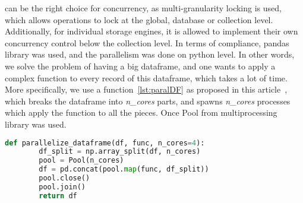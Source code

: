 can be the right choice for concurrency, 
as multi-granularity locking is used, which allows
operations to lock at the global, database or collection level. 
Additionally, for individual storage engines, it is allowed
to implement their own concurrency control below the collection level. 
In terms of compliance, pandas library was used, and the parallelism was done
on python level. In other words, we solve the problem of having 
a big dataframe, and one wants to apply a complex function to every 
record of this dataframe, which takes a lot of time. 
More specifically, we use a function~\ref{lst:paralDF} 
as proposed in this article~\cite{ParallelDF}, 
which breaks the dataframe into \emph{n\_cores} parts, 
and spawns \emph{n\_cores} processes which apply 
the function to all the pieces. Once 
Pool from multiprocessing 
library was used.
\begin{lstlisting}[language=Python, caption= {Kernel Parallelization in Python}, 
	label={lst:paralDF}]
	def parallelize_dataframe(df, func, n_cores=4):
		df_split = np.array_split(df, n_cores)
		pool = Pool(n_cores)
		df = pd.concat(pool.map(func, df_split))
		pool.close()
		pool.join()
		return df
\end{lstlisting}


